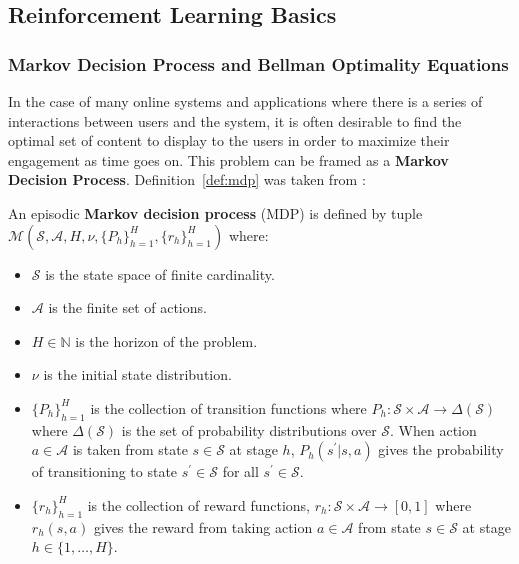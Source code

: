 \documentclass{mldsmsc}
\begin{document}
\subsection{Reinforcement Learning Basics}

\subsubsection{Markov Decision Process and Bellman Optimality Equations}

In the case of many online systems and applications where there is a series of interactions between
users and the system, it is often desirable to find the optimal set of content to display to the
users in order to maximize their engagement as time goes on. This problem can be framed as a
\textbf{Markov Decision Process}. Definition~\ref{def:mdp} was taken from \citep{pike-burke2024LearnigAgents}:

\begin{definition}\label{def:mdp}
    An episodic \textbf{Markov decision process} (MDP) is defined by tuple $\mathcal{M}
    (\mathcal{S},\mathcal{A}, H,\nu, \{P_{h}\}_{h=1}^{H},\{r_{h}\}_{h=1}^{H})$ where:
    \begin{itemize}
        \item $\mathcal{S}$ is the state space of finite cardinality.
        \item $\mathcal{A}$ is the finite set of actions.
        \item $H \in \mathbb{N}$ is the horizon of the problem.
        \item $\nu$ is the initial state distribution.
        \item $\{P_{h}\}_{h=1}^{H}$ is the collection of transition functions where
        $P_h: \mathcal{S} \times \mathcal{A} \rightarrow \Delta(\mathcal{S})$
        where $\Delta(\mathcal{S})$ is the set of probability distributions over
        $\mathcal{S}$. When action $a \in \mathcal{A}$ is taken from state $s \in \mathcal{S}$
        at stage $h$, $P_h(s^\prime | s, a)$ gives the probability of transitioning to state
        $s^\prime \in \mathcal{S}$ for all $s^\prime \in \mathcal{S}$.
        \item $\{r_{h}\}_{h=1}^{H}$ is the collection of reward functions, $r_h : \mathcal{S} \times \mathcal{A} \rightarrow [0,1]$
        where $r_h(s,a)$ gives the reward from taking action $a \in \mathcal{A}$ from state $s \in \mathcal{S}$
        at stage $h \in \{1, \ldots, H\}$.
    \end{itemize}
\end{definition}
\end{document}
